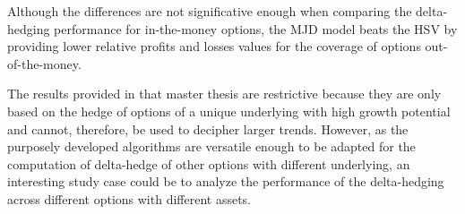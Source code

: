 \documentclass[a4paper, 12pt]{report}
\begin{document}
Although the differences are not significative enough when comparing the delta-hedging performance for in-the-money options, the MJD model beats the HSV by providing lower relative profits and losses values for the coverage of options out-of-the-money.

The results provided in that master thesis are restrictive because they are only based on the hedge of options of a unique underlying with high growth potential and cannot, therefore, be used to decipher larger trends.
However, as the purposely developed algorithms are versatile enough to be adapted for the computation of delta-hedge of other options with different underlying, an interesting study case could be to analyze the performance of the delta-hedging across different options with different assets.




\end{document}
